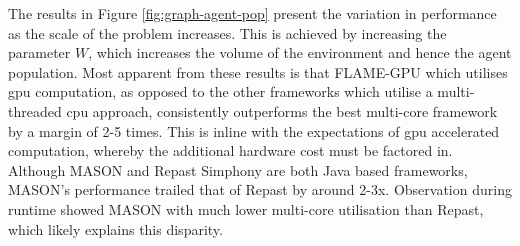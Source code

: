   The results in Figure \ref{fig:graph-agent-pop} present the variation in performance as the scale of the problem increases. This is achieved by increasing the parameter $W$, which increases the volume of the environment and hence the agent population.
  Most apparent from these results is that FLAME-GPU which utilises \gls{gpu} computation, as opposed to the other frameworks which utilise a multi-threaded \gls{cpu} approach, consistently outperforms the best multi-core framework by a margin of 2-5 times. This is inline with the expectations of \gls{gpu} accelerated computation\cite{LK*10}, whereby the additional hardware cost must be factored in. Although MASON and Repast Simphony are both Java based frameworks, MASON's performance trailed that of Repast by around 2-3x. Observation during runtime showed MASON with much lower multi-core utilisation than Repast, which likely explains this disparity.
